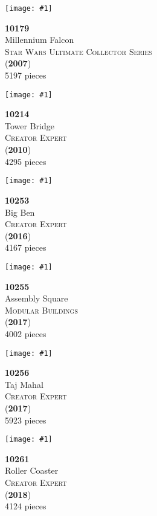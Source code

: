 \documentclass[letterpaper]{article}%
\newenvironment{legocell}[1]
{
	\begin{minipage}[c][2.0in][c]{4in}
	\centering
	\varwidth{3.6in}
	\raggedright %
	\begin{minipage}[c]{1.3in}
		\texttt{[image: \#1]}
	\end{minipage}
	\begin{minipage}[c]{2.2in}
	\raggedright
}
{
	\end{minipage}
	\endvarwidth
	\end{minipage}
	\allowbreak
	\ignorespaces
}
\begin{document}
\Large
\begin{legocell}{images/set_10179-1.jpg}
\textbf{10179}\\
{\sffamily\large Millennium Falcon}\\
\textsc{\color{DarkBlue}\normalsize Star Wars Ultimate Collector Series}\\
(\textbf{2007})\\
{\normalsize 5197 pieces}\\
\end{legocell}
\begin{legocell}{images/set_10214-1.jpg}
\textbf{10214}\\
{\sffamily\large Tower Bridge}\\
\textsc{\color{DarkBlue}\normalsize Creator Expert}\\
(\textbf{2010})\\
{\normalsize 4295 pieces}\\
\end{legocell}
\begin{legocell}{images/set_10253-1.jpg}
\textbf{10253}\\
{\sffamily\large Big Ben}\\
\textsc{\color{DarkBlue}\normalsize Creator Expert}\\
(\textbf{2016})\\
{\normalsize 4167 pieces}\\
\end{legocell}
\begin{legocell}{images/set_10255-1.jpg}
\textbf{10255}\\
{\sffamily\large Assembly Square}\\
\textsc{\color{DarkBlue}\normalsize Modular Buildings}\\
(\textbf{2017})\\
{\normalsize 4002 pieces}\\
\end{legocell}
\begin{legocell}{images/set_10256-1.jpg}
\textbf{10256}\\
{\sffamily\large Taj Mahal}\\
\textsc{\color{DarkBlue}\normalsize Creator Expert}\\
(\textbf{2017})\\
{\normalsize 5923 pieces}\\
\end{legocell}
\begin{legocell}{images/set_10261-1.jpg}
\textbf{10261}\\
{\sffamily\large Roller Coaster}\\
\textsc{\color{DarkBlue}\normalsize Creator Expert}\\
(\textbf{2018})\\
{\normalsize 4124 pieces}\\
\end{legocell}
\end{document}
